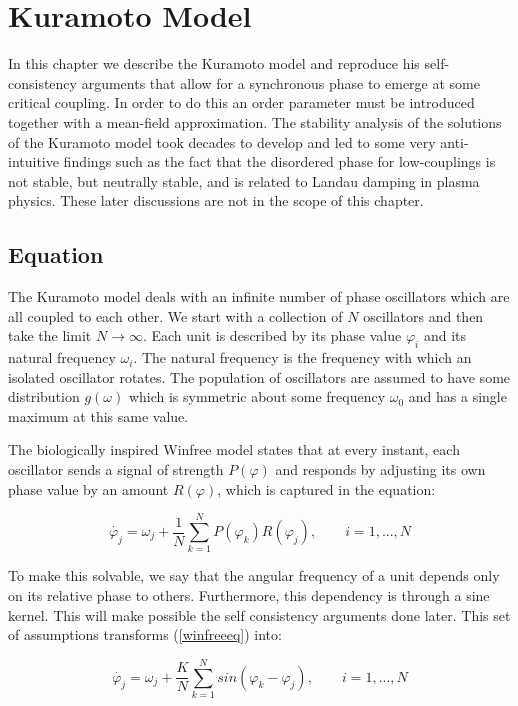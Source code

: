 \chapter{Kuramoto Model}


In this chapter we describe the Kuramoto model and reproduce his self-consistency arguments that allow for a synchronous phase to
emerge at some critical coupling. In order to do this an order parameter must be introduced together with a mean-field approximation.
The stability analysis of the solutions of the Kuramoto model took decades to develop and led to some very anti-intuitive findings such
as the fact that the disordered phase for low-couplings is not stable, but neutrally stable, and is related to Landau damping in plasma
physics. These later discussions are not in the scope of this chapter.

\section{Equation}

The Kuramoto model deals with an infinite number of phase oscillators which are all coupled to each other. We start with a collection
of $N$ oscillators and then take the limit $N \to \infty$. Each unit is described by its phase value $\varphi_i$ and its natural
frequency $\omega_i$. The natural frequency is the frequency with which an isolated oscillator rotates. The population of oscillators
are assumed to have some distribution $g(\omega)$ which is symmetric about some frequency $\omega_0$ and has a single maximum at this
same value.

The biologically inspired Winfree model states that at every instant, each oscillator sends a signal of strength $P(\varphi)$ and
responds by adjusting its own phase value by an amount $R(\varphi)$, which is captured in the equation:

\begin{equation}
    \label{winfreeeq}
    \dot{\varphi_j} = \omega_j + \frac{1}{N}\sum_{k=1}^{N}P(\varphi_k)R(\varphi_j), \qquad i=1,...,N
\end{equation}

To make this solvable, we say that the angular frequency of a unit depends only on its relative phase to others. Furthermore, this
dependency is through a sine kernel. This will make possible the self consistency arguments done later. This set of assumptions
transforms (\ref{winfreeeq}) into:

\begin{equation}
    \label{kuramotoeq}
    \dot{\varphi_j} = \omega_j + \frac{K}{N}\sum_{k=1}^{N}sin(\varphi_k - \varphi_j), \qquad i=1,...,N
\end{equation}

